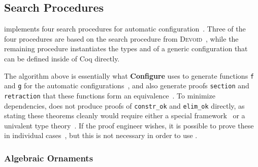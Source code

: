 \subsection{Search Procedures}
\label{sec:proc}

\toolnamec implements four search procedures for automatic configuration~\href{https://github.com/uwplse/pumpkin-pi/blob/v2.0.0/plugin/src/automation/lift/liftconfig.ml}{}.
Three of the four procedures are based on the search procedure from 
\textsc{Devoid}~\cite{Ringer2019},
while the remaining procedure instantiates the types \Aa and \B of a generic configuration that can be defined inside of Coq directly.

The algorithm above is essentially what \textbf{Configure} uses to generate functions \lstinline{f} and \lstinline{g} for the automatic configurations~\href{https://github.com/uwplse/pumpkin-pi/blob/v2.0.0/plugin/src/automation/search/search.ml}{}, %
and also generate proofs \lstinline{section} and \lstinline{retraction} that these functions form an equivalence~\href{https://github.com/uwplse/pumpkin-pi/blob/v2.0.0/plugin/src/automation/search/equivalence.ml}{}. %
To minimize dependencies, \toolnamec does not produce proofs of \lstinline{constr_ok} and \lstinline{elim_ok} directly,
as stating these theorems cleanly would require either a special framework~\cite{tabareau2017equivalences}
or a univalent type theory~\cite{univalent2013homotopy}.
If the proof engineer wishes, it is possible to prove these in individual cases~\href{https://github.com/uwplse/pumpkin-pi/blob/v2.0.0/plugin/coq/playground/arbitrary.v}{}, %
but this is not necessary in order to use \toolnamec. %


\subsubsection{Algebraic Ornaments}

